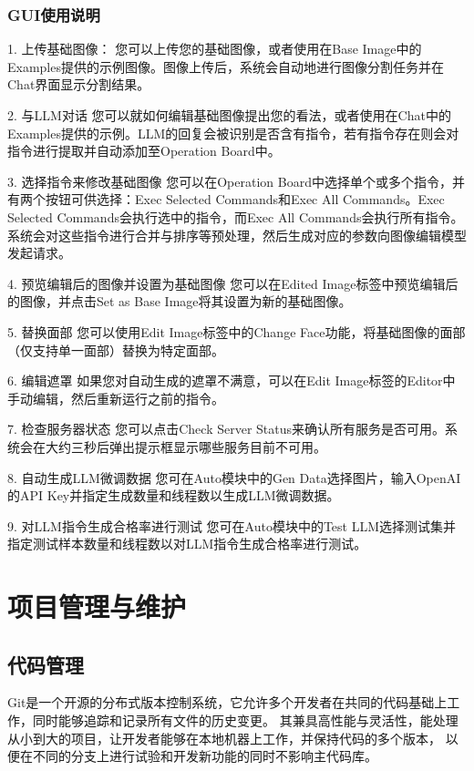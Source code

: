 \documentclass[a4paper,AutoFakeBold,oneside,12pt]{book}
\begin{document}
\subsection{GUI使用说明}
1. 上传基础图像：
您可以上传您的基础图像，或者使用在Base Image中的Examples提供的示例图像。图像上传后，系统会自动地进行图像分割任务并在Chat界面显示分割结果。

2. 与LLM对话
您可以就如何编辑基础图像提出您的看法，或者使用在Chat中的Examples提供的示例。LLM的回复会被识别是否含有指令，若有指令存在则会对指令进行提取并自动添加至Operation Board中。

3. 选择指令来修改基础图像
您可以在Operation Board中选择单个或多个指令，并有两个按钮可供选择：Exec Selected Commands和Exec All Commands。Exec Selected Commands会执行选中的指令，而Exec All Commands会执行所有指令。系统会对这些指令进行合并与排序等预处理，然后生成对应的参数向图像编辑模型发起请求。

4. 预览编辑后的图像并设置为基础图像
您可以在Edited Image标签中预览编辑后的图像，并点击Set as Base Image将其设置为新的基础图像。

5. 替换面部
您可以使用Edit Image标签中的Change Face功能，将基础图像的面部（仅支持单一面部）替换为特定面部。

6. 编辑遮罩
如果您对自动生成的遮罩不满意，可以在Edit Image标签的Editor中手动编辑，然后重新运行之前的指令。

7. 检查服务器状态
您可以点击Check Server Status来确认所有服务是否可用。系统会在大约三秒后弹出提示框显示哪些服务目前不可用。

8. 自动生成LLM微调数据
您可在Auto模块中的Gen Data选择图片，输入OpenAI的API Key并指定生成数量和线程数以生成LLM微调数据。

9. 对LLM指令生成合格率进行测试
您可在Auto模块中的Test LLM选择测试集并指定测试样本数量和线程数以对LLM指令生成合格率进行测试。


\chapter{项目管理与维护} %
\section{代码管理}
Git是一个开源的分布式版本控制系统，它允许多个开发者在共同的代码基础上工作，同时能够追踪和记录所有文件的历史变更。
其兼具高性能与灵活性，能处理从小到大的项目，让开发者能够在本地机器上工作，并保持代码的多个版本，
以便在不同的分支上进行试验和开发新功能的同时不影响主代码库。
\end{document}
